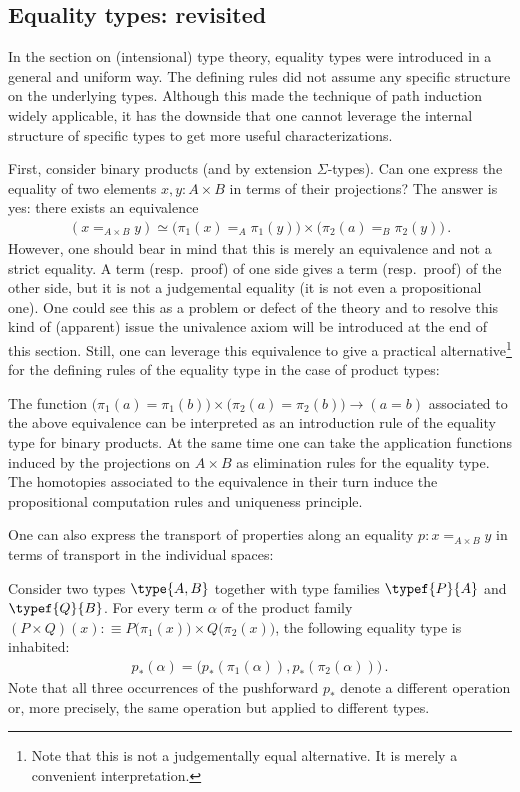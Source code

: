 \subsection{Equality types: revisited}

    In the section on (intensional) type theory, equality types were introduced in a general and uniform way. The defining rules did not assume any specific structure on the underlying types. Although this made the technique of path induction widely applicable, it has the downside that one cannot leverage the internal structure of specific types to get more useful characterizations.

    First, consider binary products (and by extension $\Sigma$-types). Can one express the equality of two elements $x,y:A\times B$ in terms of their projections? The answer is yes: there exists an equivalence
    \begin{gather}
        (x=_{A\times B}y)\simeq\bigl(\pi_1(x)=_A\pi_1(y)\bigr)\times\bigl(\pi_2(a)=_B\pi_2(y)\bigr)\,.
    \end{gather}
    However, one should bear in mind that this is merely an equivalence and not a strict equality. A term (resp.~proof) of one side gives a term (resp.~proof) of the other side, but it is not a judgemental equality (it is not even a propositional one). One could see this as a problem or defect of the theory and to resolve this kind of (apparent) issue the univalence axiom will be introduced at the end of this section. Still, one can leverage this equivalence to give a practical alternative\footnote{Note that this is not a judgementally equal alternative. It is merely a convenient interpretation.} for the defining rules of the equality type in the case of product types:
    \begin{remark}
        The function $\bigl(\pi_1(a)=\pi_1(b)\bigr)\times\bigl(\pi_2(a)=\pi_2(b)\bigr)\rightarrow(a=b)$ associated to the above equivalence can be interpreted as an introduction rule of the equality type for binary products. At the same time one can take the application functions induced by the projections on $A\times B$ as elimination rules for the equality type. The homotopies associated to the equivalence in their turn induce the propositional computation rules and uniqueness principle.
    \end{remark}

    One can also express the transport of properties along an equality $p:x=_{A\times B}y$ in terms of transport in the individual spaces:
    \begin{property}
        Consider two types $\type{A, B}$ together with type families $\typef{P}{A}$ and $\typef{Q}{B}$. For every term $\alpha$ of the product family $(P\times Q)(x):\equiv P\bigl(\pi_1(x)\bigr)\times Q\bigl(\pi_2(x)\bigr)$, the following equality type is inhabited:
        \begin{gather}
            p_*(\alpha) = \bigl(p_*(\pi_1(\alpha)), p_*(\pi_2(\alpha))\bigr)\,.
        \end{gather}
        Note that all three occurrences of the pushforward $p_*$ denote a different operation or, more precisely, the same operation but applied to different types.
    \end{property}

